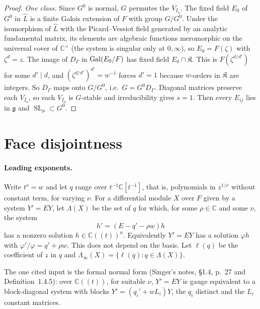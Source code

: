 \documentclass[11pt]{article}
\numberwithin{equation}{section}
\theoremstyle{definition}
\theoremstyle{remark}
\newcommand{\C}{\mathbb C}\newcommand{\Q}{\mathbb Q}\newcommand{\R}{\mathbb R}\newcommand{\Z}{\mathbb Z}
\newcommand{\SL}{\operatorname{SL}}\newcommand{\GL}{\operatorname{GL}}\newcommand{\PGL}{\operatorname{PGL}}
\begin{document}
\begin{proof}
\emph{One class.} Since $G^0$ is normal, $G$ permutes the $V_{I_a}$. The fixed
field $E_0$ of $G^0$ in $\widehat L$ is a finite Galois extension of $F$ with
group $G/G^0$. Under the isomorphism of $\widehat L$ with the Picard--Vessiot
field generated by an analytic fundamental matrix, its elements are algebraic
functions meromorphic on the universal cover of $\C^\times$ (the system is
singular only at $0,\infty$), so $E_0=F(\zeta)$ with $\zeta^d=z$. The image of
$D_\Gamma$ in $\operatorname{Gal}(E_0/F)$ has fixed field $E_0\cap\mathfrak K$. This is
$F(\zeta^{d/d'})$ for some $d'\mid d$, and
$(\zeta^{d/d'})^{d'}=w^{-1}$ forces $d'=1$ because $w$-orders in $\mathfrak K$
are integers. So $D_\Gamma$ maps onto $G/G^0$, i.e.\ $G=G^0D_\Gamma$. Diagonal
matrices preserve each $V_{I_a}$, so each $V_{I_a}$ is $G$-stable and
irreducibility gives $s=1$. Then every $E_{ij}$ lies in $\mathfrak g$ and
$\SL_\mu\subset G^0$.
\end{proof}

\section{Face disjointness}

\paragraph{Leading exponents.} Write $t^\nu=w$ and let $q$ range over
$t^{-1}\C[t^{-1}]$, that is, polynomials in $z^{1/\nu}$ without constant term,
for varying $\nu$. For a differential module $X$ over $F$ given by a system
$Y'=EY$, let $\Lambda(X)$ be the set of $q$ for which, for some $\rho\in\C$ and
some $\nu$, the system
\begin{equation}\label{eq:twist}
 h'=(E-q'-\rho w)h
\end{equation}
has a nonzero solution $h\in\C((t))^n$. Equivalently $Y'=EY$ has a solution
$\varphi h$ with $\varphi'/\varphi=q'+\rho w$. This does not depend on the
basis. Let $\ell(q)$ be the coefficient of $z$ in $q$ and
$\Lambda_\infty(X)=\{\ell(q):q\in\Lambda(X)\}$.

The one cited input is the formal normal form (Singer's notes, \S1.4, p.~27 and
Definition~1.4.5): over $\C((t))$, for suitable $\nu$, $Y'=EY$ is gauge
equivalent to a block-diagonal system with blocks $Y'=(q_i'+wL_i)Y$, the $q_i$
distinct and the $L_i$ constant matrices.
\end{document}
